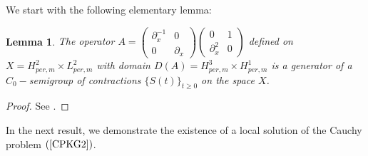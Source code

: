 \documentclass[12pt,reqno,a4paper]{amsart} %
\numberwithin{equation}{section}
\numberwithin{figure}{section}
\newtheorem{lemma}[theorem]{Lemma}
\begin{document}
We start with the following elementary lemma:

\begin{lemma}\label{lemmaC0}
	The operator $\displaystyle A=\left(\begin{array}{lll}\partial_x^{-1}&  0\\ 0&  \partial_x\end{array}\right)\left(\begin{array}{lll}0&  1\\ \partial_x^2&  0\end{array}\right)$ defined on $X=H_{per,m}^2\times L_{per,m}^2$ with domain $D(A)=H_{per,m}^3\times H_{per,m}^1$ is a generator of a $C_0-$semigroup of 
	contractions $\{S(t)\}_{t\geq0}$ on the space $X$.
\end{lemma}
\begin{proof} See \cite[Lemma 2.1]{lonardoni}. 
\end{proof}

\indent In the next result, we demonstrate the existence of a local solution of the Cauchy problem $(\ref{CPKG2})$.
\end{document}
